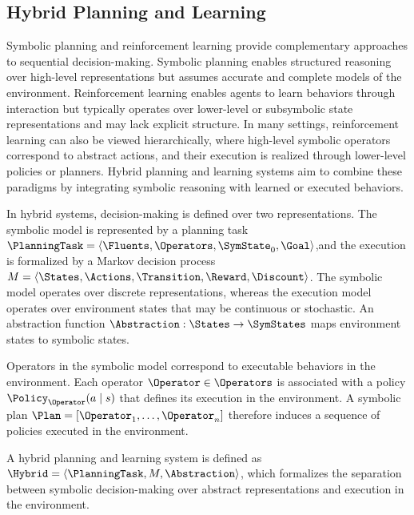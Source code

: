 \subsection{Hybrid Planning and Learning}
\label{sec:hybrid}

Symbolic planning and reinforcement learning provide complementary approaches to sequential decision-making. Symbolic planning enables structured reasoning over high-level representations but assumes accurate and complete models of the environment. Reinforcement learning enables agents to learn behaviors through interaction but typically operates over lower-level or subsymbolic state representations and may lack explicit structure. In many settings, reinforcement learning can also be viewed hierarchically, where high-level symbolic operators correspond to abstract actions, and their execution is realized through lower-level policies or planners. Hybrid planning and learning systems aim to combine these paradigms by integrating symbolic reasoning with learned or executed behaviors.

In hybrid systems, decision-making is defined over two representations. The symbolic model is represented by a planning task $\PlanningTask = \langle \Fluents, \Operators, \SymState_0, \Goal \rangle$,and the execution is formalized by a Markov decision process $M = \langle \States, \Actions, \Transition, \Reward, \Discount \rangle$. The symbolic model operates over discrete representations, whereas the execution model operates over environment states that may be continuous or stochastic. An abstraction function $\Abstraction : \States \rightarrow \SymStates$ maps environment states to symbolic states.

Operators in the symbolic model correspond to executable behaviors in the environment. Each operator $\Operator \in \Operators$ is associated with a policy $\Policy_{\Operator}(a \mid s)$ that defines its execution in the environment. A symbolic plan $\Plan = [\Operator_1, \dots, \Operator_n]$ therefore induces a sequence of policies executed in the environment.

A hybrid planning and learning system is defined as $\Hybrid = \langle \PlanningTask, M, \Abstraction \rangle$, which formalizes the separation between symbolic decision-making over abstract representations and execution in the environment.
